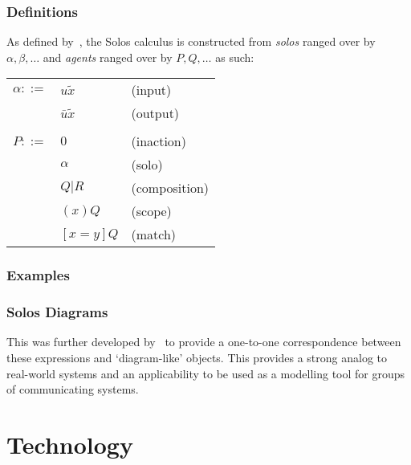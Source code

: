 \documentclass{article}
\begin{document}
        \subsubsection{Definitions}
            As defined by~\cite{solo-calculus}, the Solos calculus is constructed from \textit{solos} ranged over by $\alpha,\beta,\ldots$ and \textit{agents} ranged over by $P,Q,\ldots$ as such:
                \begin{center}
                    \begin{tabular}{ l l l }
                        $\alpha ::=$    & $u\tilde{x}$          & (input) \\
                                        & $\bar{u}\tilde{x}$    & (output) \\ \\
                        $P ::=$         & $0$                   & (inaction) \\
                                        & $\alpha$              & (solo) \\
                                        & $Q | R$               & (composition) \\
                                        & $(x)Q$                & (scope) \\
                                        & $[x=y]Q$              & (match) \\
                    \end{tabular}
                \end{center}


        \subsubsection{Examples}


        \subsubsection{Solos Diagrams}
            This was further developed by~\cite{solo-diagrams} to provide a one-to-one correspondence between these  expressions and `diagram-like' objects. This provides a strong analog to real-world systems and an applicability to be used as a modelling tool for groups of communicating systems.




\section{Technology}
\end{document}
